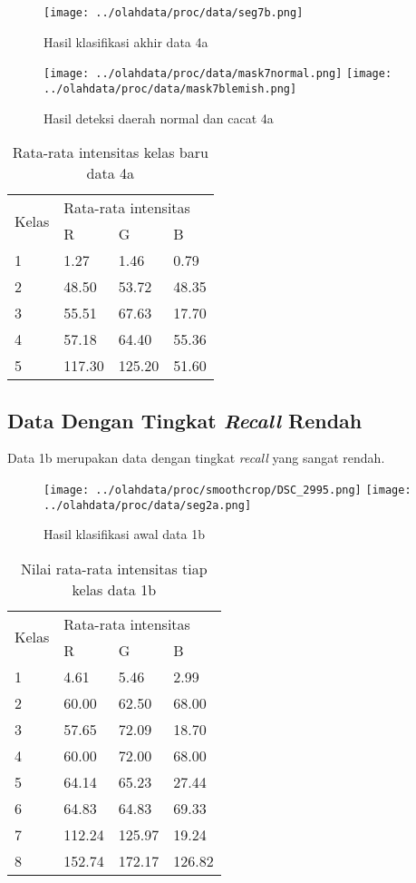 \documentclass[laporan.tex]{subfiles}
\begin{document}
\begin{figure}[h]
\centering
\texttt{[image: ../olahdata/proc/data/seg7b.png]}
\caption[]{Hasil klasifikasi akhir data 4a}
\end{figure}

\begin{figure}[h]
\centering
\texttt{[image: ../olahdata/proc/data/mask7normal.png]} \qquad
\texttt{[image: ../olahdata/proc/data/mask7blemish.png]}
\caption[]{Hasil deteksi daerah normal dan cacat 4a}
\end{figure}

\begin{table}[h!]
\centering
\begin{tabular}{|l|l|l|l|}
\cline{1-4}
\multirow{2}{*}{Kelas} & \multicolumn{3}{l|}{Rata-rata intensitas} \\
\cline{2-4}
 & R & G & B \\
\cline{1-4}
1 & 1.27 & 1.46 & 0.79 \\
2 & 48.50 & 53.72 & 48.35 \\
3 & 55.51 & 67.63 & 17.70 \\
4 & 57.18 & 64.40 & 55.36 \\
5 & 117.30 & 125.20 & 51.60 \\
\cline{1-4}
\end{tabular}
\caption[]{Rata-rata intensitas kelas baru data 4a}
\label{table:avggreen2}
\end{table}

\FloatBarrier
\subsection{Data Dengan Tingkat \emph{Recall} Rendah}

Data 1b merupakan data dengan tingkat \emph{recall} yang sangat rendah.

\begin{figure}[h!]
\centering
\texttt{[image: ../olahdata/proc/smoothcrop/DSC\_2995.png]}
\texttt{[image: ../olahdata/proc/data/seg2a.png]}
\caption[]{Hasil klasifikasi awal data 1b}
\end{figure}

\begin{table}[h!]
\centering
\begin{tabular}{|l|l|l|l|}
\cline{1-4}
\multirow{2}{*}{Kelas} & \multicolumn{3}{l|}{Rata-rata intensitas} \\
\cline{2-4}
 & R & G & B \\
\cline{1-4}
1 & 4.61 & 5.46 & 2.99 \\
2 & 60.00 & 62.50 & 68.00 \\
3 & 57.65 & 72.09 & 18.70 \\
4 & 60.00 & 72.00 & 68.00 \\
5 & 64.14 & 65.23 & 27.44 \\
6 & 64.83 & 64.83 & 69.33 \\
7 & 112.24 & 125.97 & 19.24 \\
8 & 152.74 & 172.17 & 126.82 \\
\cline{1-4}
\end{tabular}
\caption[]{Nilai rata-rata intensitas tiap kelas data 1b}
\end{table}
\end{document}
